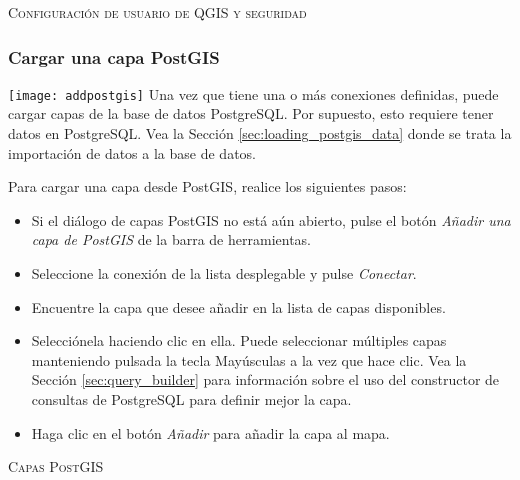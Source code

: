 \begin{Tip}\caption{\textsc{Configuración de usuario de QGIS y seguridad}}
\end{Tip}

\subsubsection{Cargar una capa PostGIS}

\texttt{[image: addpostgis]} Una vez que tiene una o más conexiones definidas, puede cargar capas de la base de datos PostgreSQL. Por supuesto, esto requiere tener datos en PostgreSQL. Vea la Sección \ref{sec:loading_postgis_data} donde se trata la importación de datos a la base de datos. 

Para cargar una capa desde PostGIS, realice los siguientes pasos:

\begin{itemize}
\item Si el diálogo de capas PostGIS no está aún abierto, pulse el botón \textit{Añadir una capa de PostGIS} de la barra de herramientas.
\item Seleccione la conexión de la lista desplegable y pulse \textsl{Conectar}.
\item Encuentre la capa que desee añadir en la lista de capas disponibles.
\item Selecciónela haciendo clic en ella. Puede seleccionar múltiples capas manteniendo pulsada la tecla Mayúsculas a la vez que hace clic. Vea la Sección \ref{sec:query_builder} para información sobre el uso del constructor de consultas de PostgreSQL para definir mejor la capa.
\item Haga clic en el botón \textsl{Añadir} para añadir la capa al mapa.
\end{itemize}

\begin{Tip}\caption{\textsc{Capas PostGIS}}
\end{Tip}

